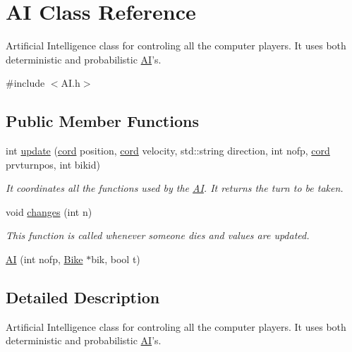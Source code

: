\hypertarget{class_a_i}{\section{A\-I Class Reference}
\label{class_a_i}
}


Artificial Intelligence class for controling all the computer players. It uses both deterministic and probabilistic \hyperlink{class_a_i}{A\-I}'s.  




{\ttfamily \#include $<$A\-I.\-h$>$}

\subsection*{Public Member Functions}
\begin{DoxyCompactItemize}
\item 
\hypertarget{class_a_i_ae234cd0c4f54bf835d0bfd8750b1b77a}{int \hyperlink{class_a_i_ae234cd0c4f54bf835d0bfd8750b1b77a}{update} (\hyperlink{classcord}{cord} position, \hyperlink{classcord}{cord} velocity, std\-::string direction, int nofp, \hyperlink{classcord}{cord} prvturnpos, int bikid)}\label{class_a_i_ae234cd0c4f54bf835d0bfd8750b1b77a}

\begin{DoxyCompactList}\small\item\em It coordinates all the functions used by the \hyperlink{class_a_i}{A\-I}. It returns the turn to be taken. \end{DoxyCompactList}\item 
\hypertarget{class_a_i_ae5ab06b9a2ef333ad2957c53ef477958}{void \hyperlink{class_a_i_ae5ab06b9a2ef333ad2957c53ef477958}{changes} (int n)}\label{class_a_i_ae5ab06b9a2ef333ad2957c53ef477958}

\begin{DoxyCompactList}\small\item\em This function is called whenever someone dies and values are updated. \end{DoxyCompactList}\item 
\hyperlink{class_a_i_a6057091f9ca0917a648400fdfcee3728}{A\-I} (int nofp, \hyperlink{class_bike}{Bike} $\ast$bik, bool t)
\end{DoxyCompactItemize}


\subsection{Detailed Description}
Artificial Intelligence class for controling all the computer players. It uses both deterministic and probabilistic \hyperlink{class_a_i}{A\-I}'s. 

